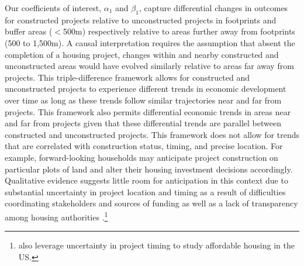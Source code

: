 \documentclass[12pt]{article}
\begin{document}
Our coefficients of interest, $\alpha_1$ and $\beta_1$, capture differential changes in outcomes for constructed projects relative to unconstructed projects in footprints and buffer areas ($<$500m) respectively relative to areas further away from footprints (500 to 1,500m).  A causal interpretation requires the assumption that absent the completion of a housing project, changes within and nearby constructed and unconstructed areas would have evolved similarly relative to areas far away from projects.  This triple-difference framework allows for constructed and unconstructed projects to experience different trends in economic development over time as long as these trends follow similar trajectories near and far from projects.  This framework also permits differential economic trends in areas near and far from projects given that these differential trends are parallel between constructed and unconstructed projects.  This framework does not allow for trends that are correlated with construction status, timing, and precise location.  For example, forward-looking households may anticipate project construction on particular plots of land and alter their housing investment decisions accordingly.  Qualitative evidence suggests little room for anticipation in this context due to substantial uncertainty in project location and timing as a result of difficulties coordinating stakeholders and sources of funding as well as a lack of transparency among housing authorities \citep{serihistory}.\footnote{\cite{diamond2016wants} also leverage uncertainty in project timing to study affordable housing in the US.} 



\end{document}
